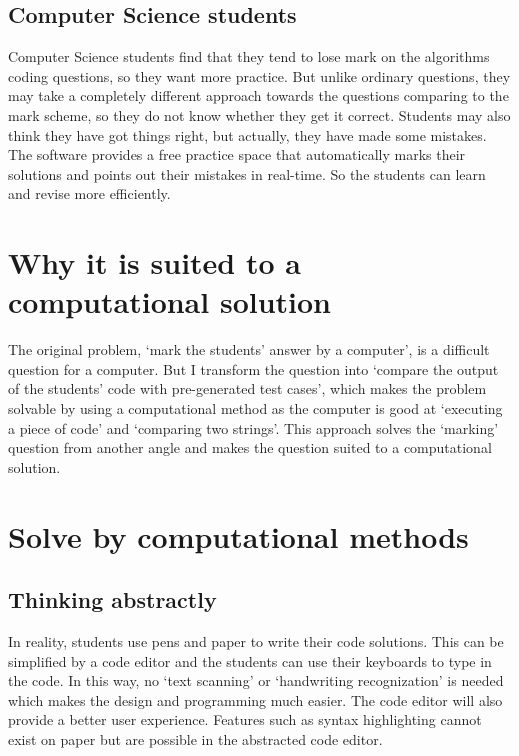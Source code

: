 \documentclass[a4paper]{report}
\begin{document}
\subsection{Computer Science students}

Computer Science students find that they tend to lose mark on the algorithms coding questions, so they want more practice. But unlike ordinary questions, they may take a completely different approach towards the questions comparing to the mark scheme, so they do not know whether they get it correct. Students may also think they have got things right, but actually, they have made some mistakes. The software provides a free practice space that automatically marks their solutions and points out their mistakes in real-time. So the students can learn and revise more efficiently.

\section{Why it is suited to a computational solution}

The original problem, `mark the students' answer by a computer', is a difficult question for a computer. But I transform the question into `compare the output of the students' code with pre-generated test cases', which makes the problem solvable by using a computational method as the computer is good at `executing a piece of code' and `comparing two strings'. This approach solves the `marking' question from another angle and makes the question suited to a computational solution.

\section{Solve by computational methods}

\subsection{Thinking abstractly}

In reality, students use pens and paper to write their code solutions. This can be simplified by a code editor and the students can use their keyboards to type in the code. In this way, no `text scanning' or `handwriting recognization' is needed which makes the design and programming much easier. The code editor will also provide a better user experience. Features such as syntax highlighting cannot exist on paper but are possible in the abstracted code editor.
\end{document}
